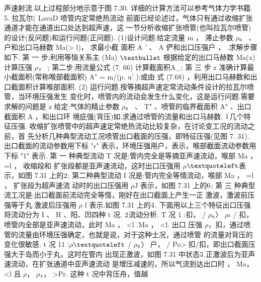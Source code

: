 声速射流.以上过程部分地示意于图 7.30. 详细的计算方法可以参考气体力学书籍. 5. 拉瓦尔( LavaD 喷管内定常绝热流动 前面已经论述过，气体只有通过收缩扩张通道才能在通道出口处达到超声速，这 一节分析收缩扩张喷管(也叫拉瓦尔喷管)的设计(反问题)和运行问题(正问题). (1)设计问题:给定流量 m ， 滞止参数 $\rho$。 、户和出口马赫数 Ma(> l)， 求最小截 面积 A ' 、 A 俨和出口压强户 ， .求解步骤如下. 第 一 步:利用等恼关系主 (Ma) ${\rm •}$ 根据给定的出口马赫数 Ma(x) 计算压强 $\rho$， ; 第二步:用流量公式 (7. 66) 计算截面积A\_; 第 三 步 z 准确计算最小截面积(常称喉部截面积) A" = m/(p. u' );或由 式 (7.68) ，利用出口马赫数和出口截面积计算喉部面积. (2) 运行问题.按等摘超声速定常流动条件设计的拉瓦尔喷管，当环境压强发生 变化时，喷管内的流动会发生什么变化，这是运行问题.需要求解的问题是 z 给定:气体的精止参数 $\rho$。 、 T" 、喷管的临界截面积 A" 、出口截面积 A ，和出口环 境庇强(背压)如.求通过喷管的流量和出口马赫数. ${\rm 1}$几个特征压强. 收缩扩张喷管中的超声速定常绝热流动比较复杂，在讨论变工况的流动之前，首 先分析几种典型流动工况喷管出口截面的压强，即特征压强(见图 7. 31). 出口截面的流动参数用下标 "r" 表示，环境压强用户，表示，喉部截面流动参数用 下标 "1" 表示. 第 一 种典型流动 T 况是:管内完全是等摘亚声速流动，喉部 Ma ， =l ， 收缩段和 扩张段都是亚声速流动，这时出口压强用 $\rho$${\rm ‘}$表示，如图 7.31 上的${\rm 2}$; 第二种典型流动 I 况是:管内完全等情流动，喉部 Ma ， =l ， 扩张段为超声速流 动时的出口压强用 $\rho$J 表示，如图 7.31 上的${\rm 6}$; 第 三 种典型流工况是:出口截面前流动完全等惰，刚好在出口截面上产生一正 激波，激波前压强等于丸$\cdot $激波后压强用 $\rho$ f 表示.如图 7.31 上的${\rm 4}$. 下面用以上三个特征出口压强将流动分为 I 、 H 、阳、凹四种 t 况. ${\rm 2}$流动分析. T 况 1 :扣， / $\rho$。〉 $\rho$$\iota$ / 扣，喷管内全部是亚声速流动，此时 Ma ， <l .Ma ， <l. 出口 压强 $\rho$，扣，通过喷管的流量由环境压强确定，也就是说，对于这种士况，通过喷管 的流量对背压的变化很敏感. t 况 11 :$\rho$${\rm ‘}$ / $\rho$。〉 户， / Po> 扣/扣，即出口截面压强大于岛而小于丸，这时在管内 出现正激波，如图 7.31 中状态${\rm 3}$.正激波后为亚声速流动，在扩张通道中亚声速流动 是增压减速的，所以气流到达出口时 ， Ma， <l 且 $\rho$， $\rho$，， >Pr. 这种 t 况中背压舟，值越

